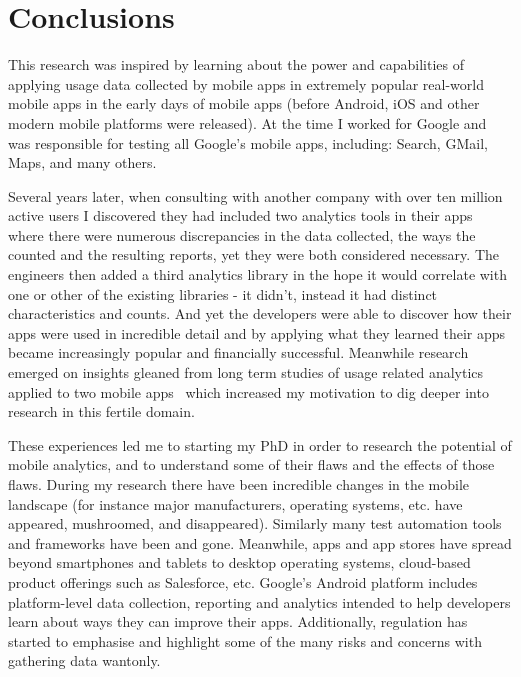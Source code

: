 \chapter{Conclusions}
\label{chapter-conclusions}


This research was inspired by learning about the power and capabilities of applying usage data collected by mobile apps in extremely popular real-world mobile apps in the early days of mobile apps (before Android, iOS and other modern mobile platforms were released). At the time I worked for Google and was responsible for testing all Google's mobile apps, including: Search, GMail, Maps, and many others.

Several years later, when consulting with another company with over ten million active users I discovered they had included two analytics tools in their apps where there were numerous discrepancies in the data collected, the ways the counted and the resulting reports, yet they were both considered necessary. The engineers then added a third analytics library in the hope it would correlate with one or other of the existing libraries - it didn't, instead it had distinct characteristics and counts. And yet the developers were able to discover how their apps were used in incredible detail and by applying what they learned their apps became increasingly popular and financially successful. Meanwhile research emerged on insights gleaned from long term studies of usage related analytics applied to two mobile apps~\citep{patro2013_capturing_mobile_experience_in_the_wild} which increased my motivation to dig deeper into research in this fertile domain.

These experiences led me to starting my PhD in order to research the potential of mobile analytics, and to understand some of their flaws and the effects of those flaws. During my research there have been incredible changes in the mobile landscape (for instance major manufacturers, operating systems, etc. have appeared, mushroomed, and disappeared). Similarly many test automation tools and frameworks have been and gone. Meanwhile, apps and app stores have spread beyond smartphones and tablets to desktop operating systems, cloud-based product offerings such as Salesforce, etc. Google's Android platform includes platform-level data collection, reporting and analytics intended to help developers learn about ways they can improve their apps. Additionally, regulation has started to emphasise and highlight some of the many risks and concerns with gathering data wantonly. 

